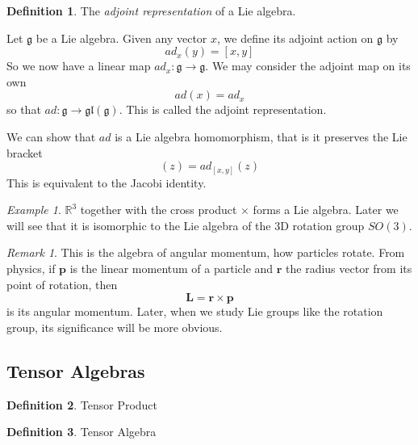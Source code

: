 \documentclass[12pt]{article}
\theoremstyle{definition}
\newtheorem{definition}{Definition}[section]
\theoremstyle{remark}
\newtheorem*{remark}{Remark}
\theoremstyle{example}
\newtheorem{example}{Example}
\theoremstyle{theorem}
\theoremstyle{lemma}
\def\b#1{\textbf{#1}}
\begin{document}
\begin{definition}
	The \textit{adjoint representation} of a Lie algebra.
	
	Let $\mathfrak{g}$ be a Lie algebra. Given any vector $x$, we define its adjoint action on $\mathfrak{g}$ by
	\begin{equation}
		ad_{x}(y)=[x,y]
	\end{equation}
	So we now have a linear map $ad_x:\mathfrak{g}\to\mathfrak{g}$. We may consider the adjoint map on its own
	\begin{equation}
		ad(x)=ad_x
	\end{equation}
	so that $ad:\mathfrak{g}\to\mathfrak{gl}(\mathfrak{g})$. This is called the adjoint representation.
	
	We can show that $ad$ is a Lie algebra homomorphism, that is it preserves the Lie bracket
	\begin{equation}
		[ad_x,ad_y](z)=ad_{[x,y]}(z)
	\end{equation}
	This is equivalent to the Jacobi identity.
\end{definition}

\begin{example}
	$\mathbb{R}^3$ together with the cross product $\times$ forms a Lie algebra. Later we will see that it is isomorphic to the Lie algebra of the 3D rotation group $SO(3)$.
\end{example}

\begin{remark}
	This is the algebra of angular momentum, how particles rotate. From physics, if $\b{p}$ is the linear momentum of a particle and $\b{r}$ the radius vector from its point of rotation, then 
	\begin{equation}
		\b{L}=\b{r}\times\b{p}
	\end{equation}
	is its angular momentum. Later, when we study Lie groups like the rotation group, its significance will be more obvious.
\end{remark}

\subsection{Tensor Algebras}

\begin{definition}
	Tensor Product
\end{definition}

\begin{definition}
	Tensor Algebra
\end{definition}
\end{document}
